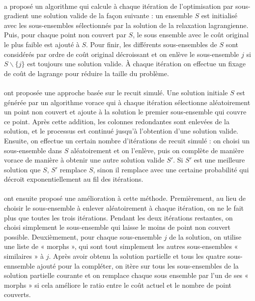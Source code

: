 \documentclass[12pt,letterpaper,twoside]{article}
\begin{document}
				\paragraph*{}
					\citeauthor{Beasley1990} a proposé un algorithme qui calcule à chaque itération de l'optimisation par sous-gradient une
					solution valide de la façon suivante : un ensemble \(S\) est initialisé avec les sous-ensembles sélectionnés
					par la solution de la relaxation lagrangienne. Puis, pour chaque point non couvert par \(S\),
					le sous ensemble avec le coût original le plus faible est ajouté à \(S\). Pour finir, les différents sous-ensembles
					de \(S\) sont considérés par ordre de coût original décroissant et on enlève le sous-ensemble \(j\) si \(S \backslash \{j\}\)
					est toujours une solution valide. À chaque itération on effectue un fixage de coût de lagrange pour réduire la taille
					du problème.~\cite{Beasley1990}	
				\paragraph*{}
					\citeauthor{jacobs1995lsh} ont proposée une approche basée sur le recuit simulé. Une solution initiale \(S\)
					est générée par un algorithme vorace qui à chaque itération sélectionne aléatoirement un point non couvert
					et ajoute à la solution le premier sous-ensemble qui couvre ce point. Après cette addition, les colonnes
					redondantes sont enlevées de la solution, et le processus est continué jusqu'à l'obtention d'une solution valide.
					Ensuite, on effectue un certain nombre d'itérations de recuit simulé : on choisi un sous-ensemble dans \(S\) aléatoirement
					et on l'enlève, puis on complète de manière vorace de manière à obtenir une autre solution valide \(S'\). Si \(S'\)
					est une meilleure solution que \(S\), \(S'\) remplace \(S\), sinon il remplace avec une certaine probabilité qui
					décroit exponentiellement au fil des itérations.~\cite{jacobs1995lsh}
				\paragraph*{}
					\citeauthor{Brusco1999} ont ensuite proposé une amélioration à cette méthode.
					Premièrement, au lieu de choisir le sous-ensemble à enlever aléatoirement à chaque itération, on ne le fait plus
					que toutes les trois itérations. Pendant les deux itérations restantes, on choisi simplement le sous-ensemble qui
					laisse le moins de point non couvert possible. Deuxièmement, pour chaque sous-ensemble \(j\) de la solution,
					on utilise une liste de « morphs », qui sont tout simplement les autres sous-ensembles « similaires » à \(j\).
					Après avoir obtenu la solution partielle et tous les quatre sous-ennsemble ajouté pour la compléter, on itère
					sur tous les sous-ensembles de la solution partielle courante
					et on remplace chaque sous ensemble par l'un de ses « morphs » si cela améliore le ratio entre le coût actuel
					et le nombre de point couverts.~\cite{Brusco1999}
\end{document}
